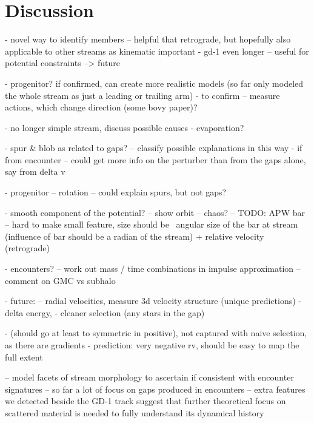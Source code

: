 \documentclass[modern]{aastex62}
\newcommand{\todo}[1]{{\color{red} TODO: #1}}
\begin{document}
\section{Discussion}
\label{sec:discussion}

- novel way to identify members -- helpful that retrograde, but hopefully also applicable to other streams as kinematic important
- gd-1 even longer -- useful for potential constraints --> future

- progenitor? if confirmed, can create more realistic models (so far only modeled the whole stream as just a leading or trailing arm)
- to confirm -- measure actions, which change direction (some bovy paper)?

- no longer simple stream, discuss possible causes
- evaporation?

- spur \& blob as related to gaps? -- classify possible explanations in this way
- if from encounter -- could get more info on the perturber than from the gaps alone, say from delta v

- progenitor
-- rotation -- could explain spurs, but not gaps?

- smooth component of the potential?
-- show orbit
-- chaos?
-- \todo{APW} bar -- hard to make small feature, size should be ~angular size of the bar at stream (influence of bar should be a radian of the stream) + relative velocity (retrograde)

- encounters?
-- work out mass / time combinations in impulse approximation
-- comment on GMC vs subhalo

- future:
-- radial velocities, measure 3d velocity structure (unique predictions)
- delta energy,
- cleaner selection (any stars in the gap)

- (should go at least to symmetric in positive), not captured with naive selection, as there are gradients
- prediction: very negative rv, should be easy to map the full extent

-- model facets of stream morphology to ascertain if consistent with encounter signatures
-- so far a lot of focus on gaps produced in encounters -- extra features we detected beside the GD-1 track suggest that further theoretical focus on scattered material is needed to fully understand its dynamical history


\end{document}
